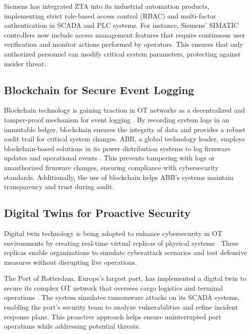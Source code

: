 Siemens has integrated ZTA into its industrial automation products, implementing strict role-based access control (RBAC) \cite{russoindustrial} and multi-factor authentication in SCADA and PLC systems. For instance, Siemens' SIMATIC controllers now include access management features that require continuous user verification and monitor actions performed by operators. This ensures that only authorized personnel can modify critical system parameters, protecting against insider threat.

\subsection {Blockchain for Secure Event Logging} 
Blockchain technology is gaining traction in OT networks as a decentralized and tamper-proof mechanism for event logging \cite{javed2023blockchain}. By recording system logs in an immutable ledger, blockchain ensures the integrity of data and provides a robust audit trail for critical system changes.
ABB, a global technology leader, employs blockchain-based solutions in its power distribution systems to log firmware updates and operational events \cite{baggio2020blockchain}. This prevents tampering with logs or unauthorized firmware changes, ensuring compliance with cybersecurity standards. Additionally, the use of blockchain helps ABB's systems maintain transparency and trust during audit.

\subsection {Digital Twins for Proactive Security} 
Digital twin technology is being adopted to enhance cybersecurity in OT environments by creating real-time virtual replicas of physical systems \cite{wang2023survey}. These replicas enable organizations to simulate cyberattack scenarios and test defensive measures without disrupting live operations.

The Port of Rotterdam, Europe’s largest port, has implemented a digital twin to secure its complex OT network that oversees cargo logistics and terminal operations \cite{wang2021multi} \cite{brull2024role}. The system simulates ransomware attacks on its SCADA systems, enabling the port’s security team to analyze vulnerabilities and refine incident response plans. This proactive approach helps ensure uninterrupted port operations while addressing potential threats.

